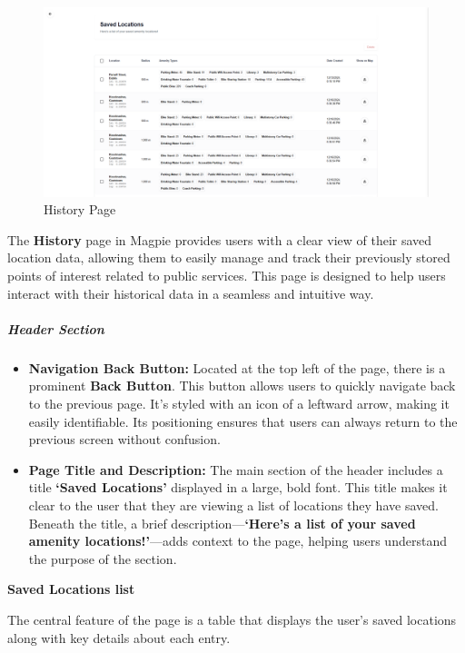 \begin{figure}[h]
    \centering{}
    \includegraphics[width=1\textwidth]{images/site/history/history_page.png}
    \caption{History Page}
\end{figure}

The \textbf{History} page in Magpie provides users with a clear view of their saved location data, allowing them to easily manage and track their previously stored points of interest related to public services. This page is designed to help users interact with their historical data in a seamless and intuitive way.

\subparagraph{Header Section}\mbox{}

\begin{itemize}
    \item{} \textbf{Navigation Back Button:} Located at the top left of the page, there is a prominent \textbf{Back Button}. This button allows users to quickly navigate back to the previous page. It’s styled with an icon of a leftward arrow, making it easily identifiable. Its positioning ensures that users can always return to the previous screen without confusion.
    \item{} \textbf{Page Title and Description:} The main section of the header includes a title \textbf{`Saved Locations'} displayed in a large, bold font. This title makes it clear to the user that they are viewing a list of locations they have saved. Beneath the title, a brief description—\textbf{`Here's a list of your saved amenity locations!'}—adds context to the page, helping users understand the purpose of the section.
\end{itemize}

\textbf{Saved Locations list}

The central feature of the page is a table that displays the user's saved locations along with key details about each entry.

